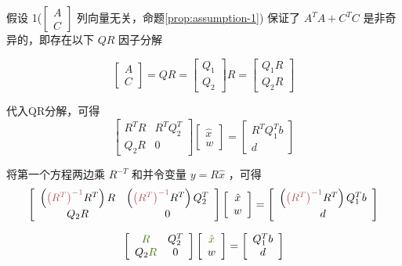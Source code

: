 假设 1($ \left[\begin{array}{l}A \\ C\end{array}\right] $ 列向量无关，命题\ref{prop:assumption-1}) 保证了 $ A^{T} A+C^{T} C $ 是非奇异的，即存在以下 $ Q R $ 因子分解

$$ \left[\begin{array}{l}A \\ C\end{array}\right]=Q R=\left[\begin{array}{l}Q_{1} \\ Q_{2}\end{array}\right] R=\left[\begin{array}{l}Q_{1} R \\ Q_{2} R\end{array}\right] $$

代入QR分解，可得
$$
\left[\begin{array}{cc}
R^{T} R & R^{T} Q_{2}^{T} \\
Q_{2} R & 0
\end{array}\right]\left[\begin{array}{c}
\hat{x} \\
w
\end{array}\right]=\left[\begin{array}{c}
R^{T} Q_{1}^{T} b \\
d
\end{array}\right]
$$

将第一个方程两边乘 $ R^{-T} $ 和并令变量 $ y=R \hat{x} $ ，可得
$$\displaystyle \left[\begin{array}{ c c }
    \left(\textcolor[rgb]{0.72,0.33,0.31}{\left( R^{T}\right)^{-1}} R^{T}\right) R & \left(\textcolor[rgb]{0.72,0.33,0.31}{\left( R^{T}\right)^{-1}} R^{T}\right) Q_{2}^{T}\\
    Q_{2} R & 0
    \end{array}\right]\left[\begin{array}{ c }
    \hat{x}\\
    w
    \end{array}\right] =\left[\begin{array}{ c }
    \left(\textcolor[rgb]{0.72,0.33,0.31}{\left( R^{T}\right)^{-1}} R^{T}\right) Q_{1}^{T} b\\
    d
    \end{array}\right]$$

$$\displaystyle \left[\begin{array}{ c c }
    \textcolor[rgb]{0.25,0.46,0.02}{R} & Q_{2}^{T}\\
    Q_{2}\textcolor[rgb]{0.25,0.46,0.02}{R} & 0
    \end{array}\right]\left[\begin{array}{ c }
    \textcolor[rgb]{0.25,0.46,0.02}{\hat{x}}\\
    w
    \end{array}\right] =\left[\begin{array}{ c }
    Q_{1}^{T} b\\
    d
    \end{array}\right]$$

